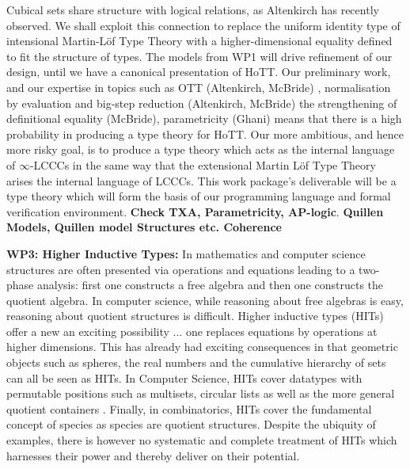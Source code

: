 \documentclass[a4paper,11pt]{article}
\begin{document}

Cubical sets share structure with logical relations, as Altenkirch has
recently observed. We shall exploit this connection to replace the
uniform identity type of intensional Martin-L\"of Type Theory with a
higher-dimensional equality defined to fit the structure of types. The
models from WP1 will drive refinement of our design, until we have a
canonical presentation of HoTT. Our preliminary work, and our
expertise in topics such as OTT (Altenkirch, McBride) \cite{alti:ott-conf}, normalisation
by evaluation and big-step reduction (Altenkirch, McBride) \cite{alti:ctcs95,alti:lics96,alti:flops04,txa:jtait} the
strengthening of definitional equality (McBride), parametricity
(Ghani) means that there is a high probability in producing a type
theory for HoTT. Our more ambitious, and hence more risky goal, is to
produce a type theory which acts as the internal language of
$\infty$-LCCCs in the same way that the extensional Martin L\"of Type
Theory arises the internal language of LCCCs.  This work package's
deliverable will be a type theory which will form the basis of our
programming language and formal verification environment. {\bf Check
  TXA, Parametricity, AP-logic}.  {\bf Quillen Models, Quillen model
  Structures etc. Coherence}


{\bf WP3: Higher Inductive Types:} In mathematics and computer science
structures are often presented via operations and equations leading to
a two-phase analysis: first one constructs a free algebra and then one
constructs the quotient algebra. In computer science, while reasoning
about free algebras is easy, reasoning about quotient structures is
difficult. Higher inductive types (HITs) offer a new an exciting
possibility ... one replaces equations by operations at higher
dimensions. This has already had exciting consequences in that
geometric objects such as spheres, the real numbers and the
cumulative hierarchy of sets can all be seen as HITs.  In Computer
Science, HITs cover datatypes with permutable positions such as
multisets, circular lists as well as the more general quotient
containers \cite{alti:mpc04,
  EPSRC_Containers}.  Finally, in combinatorics, HITs cover the
fundamental concept of species as species are quotient
structures. Despite the ubiquity of examples, there is however no
systematic and complete treatment of HITs which harnesses their power
and thereby deliver on their potential.
\end{document}
